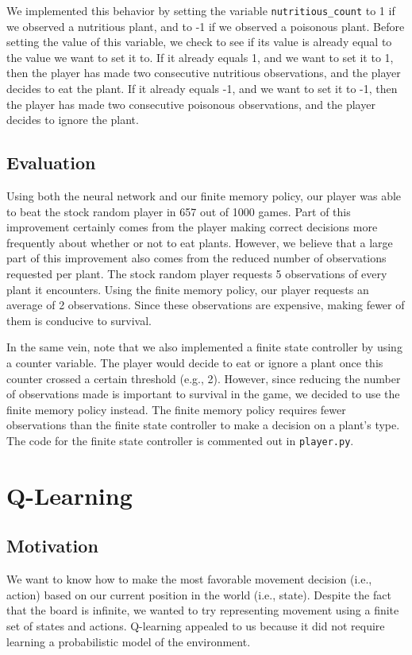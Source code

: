 \documentclass[solution, letterpaper]{cs121}
\begin{document}
We implemented this behavior by setting the variable {\tt nutritious\_count} to 1 if we observed a nutritious plant, and to -1 if we observed a poisonous plant. Before setting the value of this variable, we check to see if its value is already equal to the value we want to set it to. If it already equals 1, and we want to set it to 1, then the player has made two consecutive nutritious observations, and the player decides to eat the plant. If it already equals -1, and we want to set it to -1, then the player has made two consecutive poisonous observations, and the player decides to ignore the plant.

\subsection{Evaluation}
Using both the neural network and our finite memory policy, our player was able to beat the stock random player in 657 out of 1000 games. Part of this improvement certainly comes from the player making correct decisions more frequently about whether or not to eat plants. However, we believe that a large part of this improvement also comes from the reduced number of observations requested per plant. The stock random player requests 5 observations of every plant it encounters. Using the finite memory policy, our player requests an average of 2 observations. Since these observations are expensive, making fewer of them is conducive to survival.

In the same vein, note that we also implemented a finite state controller by using a counter variable. The player would decide to eat or ignore a plant once this counter crossed a certain threshold (e.g., 2). However, since reducing the number of observations made is important to survival in the game, we decided to use the finite memory policy instead. The finite memory policy requires fewer observations than the finite state controller to make a decision on a plant's type. The code for the finite state controller is commented out in {\tt player.py}.

\section{Q-Learning}
\subsection{Motivation}
\hspace{4mm}We want to know how to make the most favorable movement decision (i.e., action) based on our current position in the world (i.e., state). Despite the fact that the board is infinite, we wanted to try representing movement using a finite set of states and actions. Q-learning appealed to us because it did not require learning a probabilistic model of the environment.
\end{document}
